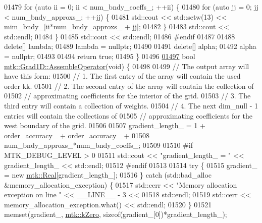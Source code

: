 \begin{DoxyCode}
{{01479   \textcolor{keywordflow}{for} (\textcolor{keyword}{auto} ii = 0; ii < num\_bndy\_coeffs\_; ++ii) \{
01480     \textcolor{keywordflow}{for} (\textcolor{keyword}{auto} jj = 0; jj < num\_bndy\_approxs\_; ++jj) \{
01481       std::cout << std::setw(13) << mim\_bndy\_[ii*num\_bndy\_approxs\_ + jj];
01482     \}
01483     std::cout << std::endl;
01484   \}
01485   std::cout << std::endl;
01486 \textcolor{preprocessor}{  #endif}
01487 
01488   \textcolor{keyword}{delete}[] lambda;
01489   lambda = \textcolor{keyword}{nullptr};
01490 
01491   \textcolor{keyword}{delete}[] alpha;
01492   alpha = \textcolor{keyword}{nullptr};
01493 
01494   \textcolor{keywordflow}{return} \textcolor{keyword}{true};
01495 \}
01496 
\hypertarget{mtk__grad__1d_8cc_source_l01497}{}\hyperlink{classmtk_1_1Grad1D_a4eb4d363506b8c64b2bb18a318bbd259}{01497} \textcolor{keywordtype}{bool} \hyperlink{classmtk_1_1Grad1D_a4eb4d363506b8c64b2bb18a318bbd259}{mtk::Grad1D::AssembleOperator}(\textcolor{keywordtype}{void}) \{
01498 
01499   \textcolor{comment}{// The output array will have this form:}
01500   \textcolor{comment}{// 1. The first entry of the array will contain the used order kk.}
01501   \textcolor{comment}{// 2. The second entry of the array will contain the collection of}
01502   \textcolor{comment}{// approximating coefficients for the interior of the grid.}
01503   \textcolor{comment}{// 3. The third entry will contain a collection of weights.}
01504   \textcolor{comment}{// 4. The next dim\_null - 1 entries will contain the collections of}
01505   \textcolor{comment}{// approximating coefficients for the west boundary of the grid.}
01506 
01507   gradient\_length\_ = 1 + order\_accuracy\_ + order\_accuracy\_ +
01508     num\_bndy\_approxs\_*num\_bndy\_coeffs\_;
01509 
01510 \textcolor{preprocessor}{  #if MTK\_DEBUG\_LEVEL > 0}
01511   std::cout << \textcolor{stringliteral}{"gradient\_length\_ = "} << gradient\_length\_ << std::endl;
01512 \textcolor{preprocessor}{  #endif}
01513 
01514   \textcolor{keywordflow}{try} \{
01515     gradient\_ = \textcolor{keyword}{new} \hyperlink{group__c01-roots_gac080bbbf5cbb5502c9f00405f894857d}{mtk::Real}[gradient\_length\_];
01516   \} \textcolor{keywordflow}{catch} (std::bad\_alloc &memory\_allocation\_exception) \{
01517     std::cerr << \textcolor{stringliteral}{"Memory allocation exception on line "} << \_\_LINE\_\_ - 3 <<
01518       std::endl;
01519     std::cerr << memory\_allocation\_exception.what() << std::endl;
01520   \}
01521   memset(gradient\_, \hyperlink{group__c01-roots_ga59a451a5fae30d59649bcda274fea271}{mtk::kZero}, \textcolor{keyword}{sizeof}(gradient\_[0])*gradient\_length\_);
}}
\end{DoxyCode}
